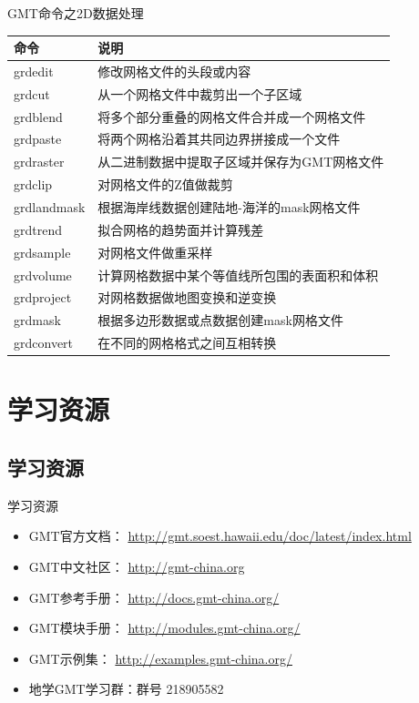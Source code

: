 \documentclass[UTF8, 11pt]{ctexbeamer}
\begin{document}
\begin{frame}{GMT命令之2D数据处理}
\begin{center}
\scriptsize
\begin{tabular}{ll}
\hline
命令 & 说明 \\
\hline
grdedit & 修改网格文件的头段或内容 \\
grdcut & 从一个网格文件中裁剪出一个子区域 \\
grdblend & 将多个部分重叠的网格文件合并成一个网格文件 \\
grdpaste & 将两个网格沿着其共同边界拼接成一个文件 \\
grdraster & 从二进制数据中提取子区域并保存为GMT网格文件 \\
grdclip & 对网格文件的Z值做裁剪 \\
grdlandmask & 根据海岸线数据创建陆地-海洋的mask网格文件 \\
grdtrend & 拟合网格的趋势面并计算残差 \\
grdsample & 对网格文件做重采样 \\
grdvolume & 计算网格数据中某个等值线所包围的表面积和体积 \\
grdproject & 对网格数据做地图变换和逆变换 \\
grdmask & 根据多边形数据或点数据创建mask网格文件 \\
grdconvert & 在不同的网格格式之间互相转换 \\
\hline
\end{tabular}
\end{center}
\end{frame}

\section{学习资源}
\subsection{学习资源}
\begin{frame}{学习资源}
\begin{itemize}
\item GMT官方文档： \scriptsize{\url{http://gmt.soest.hawaii.edu/doc/latest/index.html}}
\item GMT中文社区： \url{http://gmt-china.org}
\item GMT参考手册： \url{http://docs.gmt-china.org/}
\item GMT模块手册： \url{http://modules.gmt-china.org/}
\item GMT示例集： \url{http://examples.gmt-china.org/}
\item 地学GMT学习群：群号 218905582
\end{itemize}
\end{frame}
\end{document}

